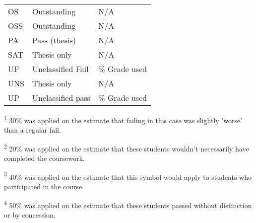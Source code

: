 \begin{table}[H]
\begin{threeparttable}
\begin{tabularx}{\textwidth}{>{\hsize=0.6\hsize}X>{\hsize=1.3\hsize}X>{\hsize=1.1\hsize}X}
            OS             & Outstanding              & N/A                                        \\
            OSS            & Outstanding              & N/A                                        \\
            PA             & Pass (thesis)            & N/A                                        \\
            SAT            & Thesis only              & N/A                                        \\
            UF             & Unclassified Fail        & 30\% Grade used\tnote{\textsuperscript{1}} \\
            UNS            & Thesis only              & N/A                                        \\
            UP             & Unclassified pass        & 50\% Grade used\tnote{\textsuperscript{4}} \\
            \bottomrule
        \end{tabularx}
        \scriptsize
        \begin{tablenotes}
            \item[\textsuperscript{1}]30\% was applied on the estimate that failing in this case was slightly 'worse' than a regular fail.
            \item[\textsuperscript{2}]20\% was applied on the estimate that these students wouldn't necessarily have completed the coursework.
            \item[\textsuperscript{3}]40\% was applied on the estimate that this symbol would apply to students who participated in the course.
            \item[\textsuperscript{4}]50\% was applied on the estimate that these students passed without distinction or by concession.
        \end{tablenotes}
    \end{threeparttable}
\end{table}
